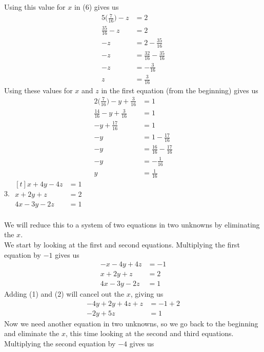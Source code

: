 \documentclass[12pt]{article}
\begin{document}
Using this value for $x$ in (6) gives us
\begin{align*}
5\bigg(\displaystyle \frac{7}{16}\bigg)-z&=2 \\
\displaystyle \frac{35}{16}-z&=2 \\
-z&=2-\displaystyle \frac{35}{16} \\
-z&=\displaystyle \frac{32}{16}-\displaystyle \frac{35}{16} \\
-z&=-\displaystyle \frac{3}{16} \\
z&=\displaystyle \frac{3}{16}
\end{align*}
Using these values for $x$ and $z$ in the first equation (from the beginning) gives us
\begin{align*}
2\bigg(\displaystyle \frac{7}{16}\bigg)-y+\displaystyle \frac{3}{16}&=1 \\
\displaystyle \frac{14}{16}-y+\displaystyle \frac{3}{16}&=1 \\
-y+\displaystyle \frac{17}{16}&=1 \\
-y&=1-\displaystyle \frac{17}{16} \\
-y&=\displaystyle \frac{16}{16}-\displaystyle \frac{17}{16} \\
-y&=-\displaystyle \frac{1}{16} \\
y&=\displaystyle \frac{1}{16}
\end{align*}
\setcounter{equation}{0}
3. $\begin{aligned}[t]
x+4y-4z&=1 \\
x+2y+z&=2 \\
4x-3y-2z&=1
\end{aligned}$ \\
\\
We will reduce this to a system of two equations in two unknowns by eliminating the $x$. \\
We start by looking at the first and second equations. Multiplying the first equation by $-1$ gives us
\begin{align}
-x-4y+4z&=-1 \\
x+2y+z&=2 \\
4x-3y-2z&=1
\end{align}
Adding (1) and (2) will cancel out the $x$, giving us
\begin{align}
-4y+2y+4z+z&=-1+2 \\
-2y+5z&=1
\end{align}
Now we need another equation in two unknowns, so we go back to the beginning and eliminate the $x$, this time looking at the second and third equations. Multiplying the second equation by $-4$ gives us
\end{document}
